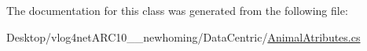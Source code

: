 The documentation for this class was generated from the following file\-:\begin{DoxyCompactItemize}
\item 
Desktop/vlog4net\-A\-R\-C10\-\_\-\_\-newhoming/\-Data\-Centric/\hyperlink{_animal_atributes_8cs}{Animal\-Atributes.\-cs}\end{DoxyCompactItemize}
